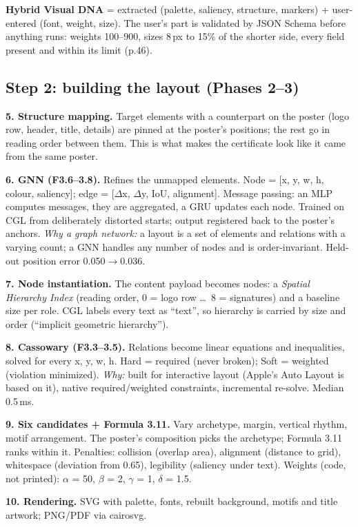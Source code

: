\documentclass[10pt,a4paper]{article}
\begin{document}
\textbf{Hybrid Visual DNA} = extracted (palette, saliency, structure, markers) + user-entered (font, weight, size). The user's part is validated by JSON Schema before anything runs: weights 100--900, sizes 8\,px to 15\% of the shorter side, every field present and within its limit (p.46).

\subsection*{Step 2: building the layout (Phases 2--3)}
\textbf{5. Structure mapping.} Target elements with a counterpart on the poster (logo row, header, title, details) are pinned at the poster's positions; the rest go in reading order between them. This is what makes the certificate look like it came from the same poster.

\textbf{6. GNN (F3.6--3.8).} Refines the unmapped elements. Node = [x, y, w, h, colour, saliency]; edge = [$\Delta$x, $\Delta$y, IoU, alignment]. Message passing: an MLP computes messages, they are aggregated, a GRU updates each node. Trained on CGL from deliberately distorted starts; output registered back to the poster's anchors. \emph{Why a graph network:} a layout is a set of elements and relations with a varying count; a GNN handles any number of nodes and is order-invariant. Held-out position error 0.050$\to$0.036.

\textbf{7. Node instantiation.} The content payload becomes nodes: a \emph{Spatial Hierarchy Index} (reading order, 0 = logo row \ldots\ 8 = signatures) and a baseline size per role. CGL labels every text as ``text'', so hierarchy is carried by size and order (``implicit geometric hierarchy'').

\textbf{8. Cassowary (F3.3--3.5).} Relations become linear equations and inequalities, solved for every x, y, w, h. Hard = required (never broken); Soft = weighted (violation minimized). \emph{Why:} built for interactive layout (Apple's Auto Layout is based on it), native required/weighted constraints, incremental re-solve. Median 0.5\,ms.

\textbf{9. Six candidates + Formula 3.11.} Vary archetype, margin, vertical rhythm, motif arrangement. The poster's composition picks the archetype; Formula 3.11 ranks within it. Penalties: collision (overlap area), alignment (distance to grid), whitespace (deviation from 0.65), legibility (saliency under text). Weights (code, not printed): $\alpha$ = 50, $\beta$ = 2, $\gamma$ = 1, $\delta$ = 1.5.

\textbf{10. Rendering.} SVG with palette, fonts, rebuilt background, motifs and title artwork; PNG/PDF via cairosvg.
\end{document}
